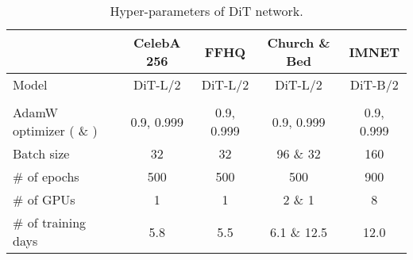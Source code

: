 \documentclass{article}
\theoremstyle{plain}
\theoremstyle{definition}
\theoremstyle{remark}
\begin{document}
\begin{table}[!ht]
    \centering
    \caption{Hyper-parameters of DiT network.}
    \begin{tabular}{l|c|c|c|c}
        \toprule
                                            & CelebA 256  & FFHQ & Church \& Bed & IMNET \\
        \midrule
        Model & DiT-L/2 & DiT-L/2 & DiT-L/2 & DiT-B/2 \\
                                     &   &  &  &  \\
        AdamW optimizer ( \& ) & 0.9, 0.999  & 0.9, 0.999 & 0.9, 0.999 & 0.9, 0.999 \\
Batch size                          & 32       & 32       &  96 \& 32 & 160     \\
        \# of epochs                        & 500      & 500       & 500 & 900  \\
        \# of GPUs                          & 1         & 1       & 2  \& 1  & 8   \\
        \# of training days & 5.8 & 5.5 & 6.1 \& 12.5 & 12.0 \\
        \bottomrule
    \end{tabular}
    \label{tab:hyperparams_dit}
\end{table}
\end{document}
